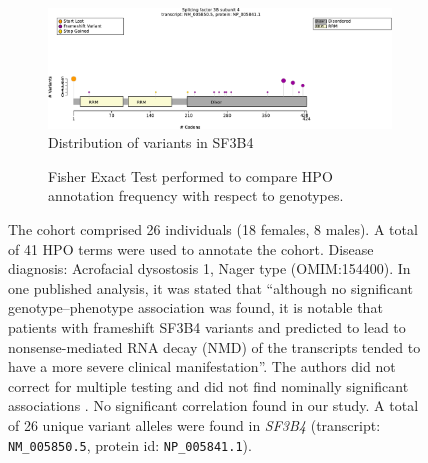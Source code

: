 \begin{figure}[htbp]
\centering
\begin{subfigure}[b]{0.95\textwidth}
\centering
\includegraphics[width=\textwidth]{ img/SF3B4_protein_diagram.pdf} 
\captionsetup{justification=raggedright,singlelinecheck=false}
\caption{Distribution of variants in SF3B4}
\end{subfigure}

\vspace{2em}

\begin{subfigure}[b]{0.95\textwidth}
\centering
{}
\captionsetup{justification=raggedright,singlelinecheck=false}
\caption{Fisher Exact Test performed to compare HPO annotation frequency with respect to genotypes.}
\end{subfigure}

\vspace{2em}

\caption{The cohort comprised 26 individuals (18 females, 8 males). A total of 41 HPO terms were used to annotate the cohort. Disease diagnosis: Acrofacial dysostosis 1, Nager type (OMIM:154400). 
In one published analysis, it was stated that ``although no significant genotype–phenotype association was found, it is notable that patients with frameshift SF3B4 variants and predicted to lead to nonsense-mediated RNA 
decay (NMD) of the transcripts tended to have a more severe clinical manifestation''. The authors did not correct for multiple testing and did not find nominally significant associations \cite{PMID_35331022}.
No significant correlation found in our study. A total of 26 unique variant alleles were found in \textit{SF3B4} (transcript: \texttt{NM\_005850.5}, protein id: \texttt{NP\_005841.1}).}
\end{figure}
